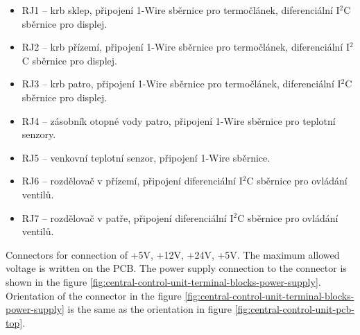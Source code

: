 \begin{Czech}
\begin{itemize}
  \item RJ1 – krb sklep, připojení 1-Wire sběrnice pro termočlánek, diferenciální I$^2$C sběrnice pro displej.
  \item RJ2 – krb přízemí, připojení 1-Wire sběrnice pro termočlánek, diferenciální I$^2$C sběrnice pro displej.
  \item RJ3 – krb patro, připojení 1-Wire sběrnice pro termočlánek, diferenciální I$^2$C sběrnice pro displej.
  \item RJ4 – zásobník otopné vody patro, připojení 1-Wire sběrnice pro teplotní senzory.
  \item RJ5 – venkovní teplotní senzor, připojení 1-Wire sběrnice.
  \item RJ6 – rozdělovač v přízemí, připojení diferenciální I$^2$C sběrnice pro ovládání ventilů.
  \item RJ7 – rozdělovač v patře, připojení diferenciální I$^2$C sběrnice pro ovládání ventilů.
\end{itemize}
\end{Czech}


\begin{English}
\end{English}

\begin{Czech}
\end{Czech}


\newpage
\begin{English}
\end{English}

\begin{Czech}
\end{Czech}


\begin{English}
Connectors for connection of +5V, +12V, +24V, +5V. The maximum allowed voltage is written on the PCB.
The power supply connection to the connector is shown in the figure \ref{fig:central-control-unit-terminal-blocks-power-supply}. Orientation of the connector in the figure \ref{fig:central-control-unit-terminal-blocks-power-supply} is the same as the orientation in figure  \ref{fig:central-control-unit-pcb-top}.
\end{English}

